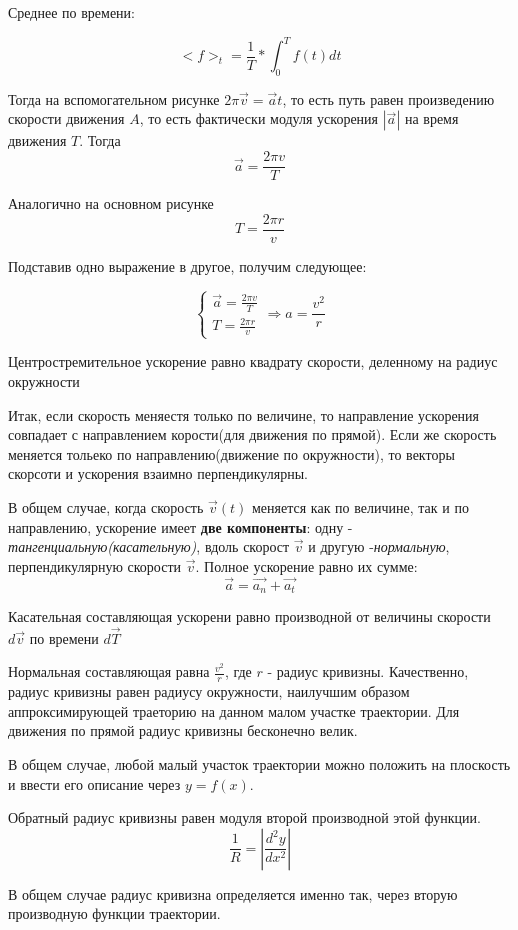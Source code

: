 \documentclass{article}
\begin{document}
Среднее по времени:

$$<f>_t = \frac{1}{T} * \int^T_0f(t)dt$$

Тогда на вспомогательном рисунке $2 \pi \vec{v} = \vec{a}t$, то есть путь равен произведению скорости движения $A$, то есть фактически модуля ускорения $|\vec{a}|$ на время движения $T$. Тогда 
$$\vec{a} = \frac{2\pi v}{T}$$

Аналогично на основном рисунке $$T=\frac{2 \pi r}{v}$$

Подставив одно выражение в другое, получим следующее:

$$
\begin{cases}
\vec{a} = \frac{2\pi v}{T}
\\
T=\frac{2 \pi r}{v}
\end{cases}\Rightarrow a = \frac{v^2}{r}
$$

Центростремительное ускорение равно квадрату скорости, деленному на радиус окружности

Итак, если скорость меняестя только по величине, то направление ускорения совпадает с направлением корости(для движения по прямой). Если же скорость меняется тольеко по направлению(движение по окружности), то векторы скорсоти и ускорения взаимно перпендикулярны.

В общем случае, когда скорость $\vec{v}(t)$ меняется как по величине, так и по направлению, ускорение имеет \textbf{ две компоненты}: одну - \emph{тангенциальную(касательную)}, вдоль скорост $\vec{v}$ и другую -\emph{нормальную}, перпендикулярную скорости $\vec{v}$. Полное ускорение равно их сумме: $$\vec{a} = \vec{a_n} + \vec{a_t}$$

Касательная составляющая ускорени равно производной от величины скорости $d\vec{v}$ по времени $d\vec{T}$

Нормальная составляющая равна $\frac{v^2}{r}$, где $r$ - радиус кривизны. Качественно, радиус кривизны равен радиусу окружности, наилучшим образом аппроксимирующей траеторию на данном малом участке траектории. Для движения по прямой радиус кривизны бесконечно велик. 

В общем случае, любой малый участок траектории можно положить на плоскость и ввести его описание через $y=f(x)$. 

Обратный радиус кривизны равен модуля второй производной этой функции.
$$\frac{1}{R} = |\frac{d^2y}{dx^2}|$$

В общем случае радиус кривизна определяется именно так, через вторую производную функции траектории.
\end{document}
